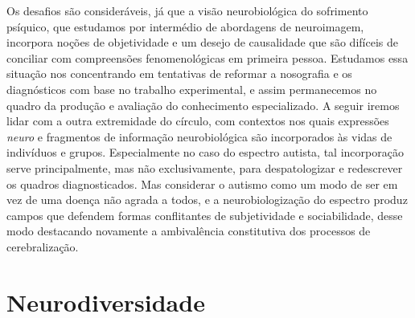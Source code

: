 Os desafios são consideráveis, já que a visão neurobiológica do
sofrimento psíquico, que estudamos por intermédio de abordagens de
neuroimagem, incorpora noções de objetividade e um desejo de causalidade
que são difíceis de conciliar com compreensões fenomenológicas em
primeira pessoa. Estudamos essa situação nos concentrando em tentativas
de reformar a nosografia e os diagnósticos com base no trabalho
experimental, e assim permanecemos no quadro da produção e avaliação do
conhecimento especializado. A seguir iremos lidar com a outra
extremidade do círculo, com contextos nos quais expressões \emph{neuro}
e fragmentos de informação neurobiológica são incorporados às vidas de
indivíduos e grupos. Especialmente no caso do espectro autista, tal
incorporação serve principalmente, mas não exclusivamente, para
despatologizar e redescrever os quadros diagnosticados. Mas considerar o
autismo como um modo de ser em vez de uma doença não agrada a todos, e a
neurobiologização do espectro produz campos que defendem formas
conflitantes de subjetividade e sociabilidade, desse modo destacando
novamente a ambivalência constitutiva dos processos de cerebralização.

\chapter{Neurodiversidade}

